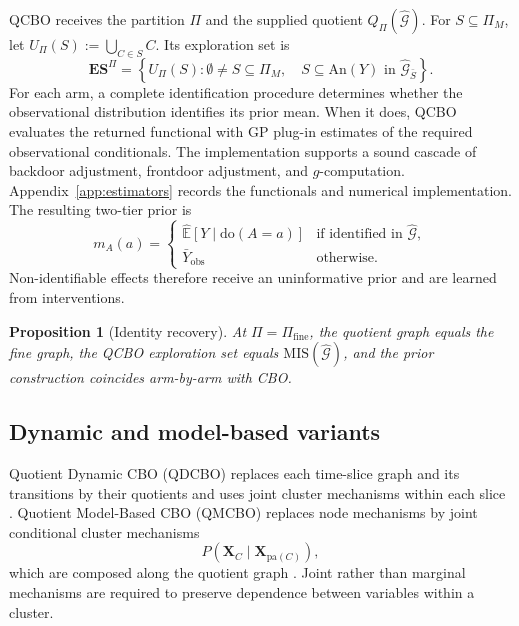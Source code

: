 \documentclass[twoside]{article}
\newtheorem{proposition}{Proposition}
\newcommand{\E}{\mathbb{E}}
\newcommand{\doo}{\mathrm{do}}
\newcommand{\An}{\mathrm{An}}
\newcommand{\Gg}{\mathcal{G}}
\newcommand{\ESpi}{\mathbf{ES}^{\Pi}}
\begin{document}
QCBO receives the partition \(\Pi\) and the supplied quotient \(Q_\Pi(\widehat{\Gg})\). For $S\subseteq\Pi_M$, let $U_\Pi(S):=\bigcup_{C\in S}C$. Its exploration set is
\begin{equation}
 \ESpi=\left\{U_\Pi(S):
 \emptyset\ne S\subseteq\Pi_M,\quad
 S\subseteq\An(Y)\text{ in }\widehat{\mathcal G}_{\bar S}\right\}.
 \label{eq:qcbo-arms}
\end{equation}
For each arm, a complete identification procedure determines whether the observational distribution identifies its prior mean. When it does, QCBO evaluates the returned functional with GP plug-in estimates of the required observational conditionals. The implementation supports a sound cascade of backdoor adjustment, frontdoor adjustment, and $g$-computation. Appendix~\ref{app:estimators} records the functionals and numerical implementation. The resulting two-tier prior is
\begin{equation}
  m_A(a)=
  \begin{cases}
    \widehat{\E}[Y\mid\doo(A=a)] & \text{if identified in }\widehat{\mathcal G},\\
    \bar Y_{\mathrm{obs}} & \text{otherwise.}
  \end{cases}
  \label{eq:two-tier-prior}
\end{equation}
Non-identifiable effects therefore receive an uninformative prior and are
learned from interventions.

\begin{proposition}[Identity recovery]
\label{prop:identity}
At $\Pi=\Pi_{\mathrm{fine}}$, the quotient graph equals the fine graph, the QCBO
exploration set equals $\mathrm{MIS}(\widehat{\Gg})$, and the prior construction
coincides arm-by-arm with CBO.
\end{proposition}

\subsection{Dynamic and model-based variants}

Quotient Dynamic CBO (QDCBO) replaces each time-slice graph and its transitions by their quotients and uses joint cluster mechanisms within each slice \citep{agliettiDynamicCausalBayesian2021a}. Quotient Model-Based CBO (QMCBO) replaces node mechanisms by joint conditional cluster mechanisms
\[
 P(\mathbf X_C\mid\mathbf X_{\mathrm{pa}(C)}),
\]
which are composed along the quotient graph
\citep{sussexMODELBASEDCAUSALBAYESIAN2023}. Joint rather than marginal
mechanisms are required to preserve dependence between variables within a
cluster.
\end{document}
